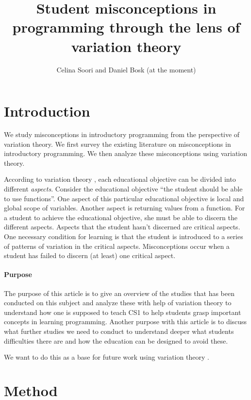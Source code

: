 \documentclass[twocolumn]{article}
\title{Student misconceptions in programming through the lens of variation 
theory}
\author{Celina Soori and Daniel Bosk (at the moment)}
\begin{document}
\maketitle
\tableofcontents

\section{Introduction}

We study misconceptions in introductory programming from the perspective of 
variation theory.
We first survey the existing literature on misconceptions in introductory 
programming.
We then analyze these misconceptions using variation theory.

According to variation theory \parencite[Ch.~2]{NCOL}, each educational 
objective can be divided into different \emph{aspects}.
Consider the educational objective \enquote{the student should be able to use 
functions}.
One aspect of this particular educational objective is local and global scope 
of variables.
Another aspect is returning values from a function.
For a student to achieve the educational objective, she must be able to discern 
the different aspects.
Aspects that the student hasn't discerned are critical aspects.
One necessary condition for learning is that the student is introduced to a 
series of patterns of variation in the critical aspects.
Misconceptions occur when a student has failed to discern (at least) one 
critical aspect.

\paragraph{Purpose}

The purpose of this article is to give an overview of the studies that has been conducted on this subject and analyze these with help of variation theory to understand how one is supposed to teach CS1 to help students grasp important concepts in learning programming. Another purpose with this article is to discuss what further studies we need to conduct to understand deeper what students difficulties there are and how the education can be designed to avoid these. 

We want to do this as a base for future work using variation theory 
\parencite{NCOL}.

\section{Method}
\end{document}
